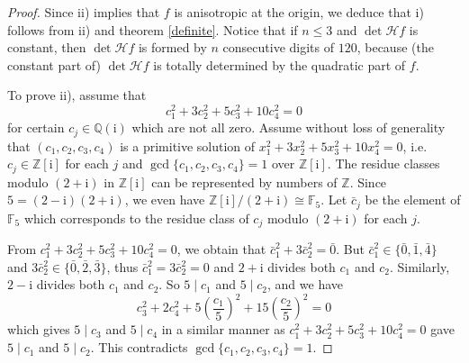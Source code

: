 \documentclass[10pt]{article}
\theoremstyle{remark}
\theoremstyle{definition}
\newcommand{\hess}{{\mathcal H}}
\newcommand{\F}{{\mathbb F}}
\newcommand{\Q}{{\mathbb Q}}
\newcommand{\Z}{{\mathbb Z}}
\newcommand{\I}{{\mathrm i}}
\begin{document}
\begin{proof}
Since ii) implies that $f$ is anisotropic at the origin, we deduce that
i) follows from ii) and theorem \ref{definite}. Notice that if $n \le 3$ and $\det \hess f$ 
is constant, then $\det \hess f$ is formed by $n$ consecutive digits of $120$, because 
(the constant part of) $\det \hess f$ is totally determined by the quadratic part of $f$.

To prove ii), assume that 
$$
c_1^2 + 3 c_2^2 + 5 c_3^2 + 10 c_4^2 = 0
$$
for certain $c_j \in \Q(\I)$ which are not all zero. Assume without loss of generality that 
$(c_1,c_2,c_3,c_4)$ is a primitive solution of  $x_1^2 + 3 x_2^2 + 5 x_3^2 + 10 x_4^2 = 0$,
i.e.\@ $c_j \in \Z[\I]$ for each $j$ and $\gcd\{c_1,c_2,c_3,c_4\} = 1$ over $\Z[\I]$.
The residue classes modulo $(2 + \I)$ in $\Z[\I]$ can be represented by numbers of $\Z$.
Since $5 = (2-\I)(2 + \I)$, we even have $\Z[\I]/(2 + \I) \cong \F_5$. Let
$\bar{c}_j$ be the element of $\F_5$ which corresponds to the residue class of $c_j$ modulo
$(2 + \I)$ for each $j$.

From $c_1^2 + 3 c_2^2 + 5 c_3^2 + 10 c_4^2 = 0$, we obtain that $\bar{c}_1^2 + 3 \bar{c}_2^2 = \bar{0}$.
But $\bar{c}_1^2 \in \{\bar{0},\bar{1},\bar{4}\}$ and $3\bar{c}_2^2 \in \{\bar{0},\bar{2},\bar{3}\}$,
thus $\bar{c}_1^2 = 3 \bar{c}_2^2 = 0$ and $2 + \I$ divides both
$c_1$ and $c_2$. Similarly, $2 - \I$ divides both
$c_1$ and $c_2$. So $5 \mid c_1$ and $5 \mid c_2$, and we have
$$
c_3^2 + 2 c_4^2 + 5 \left( \frac{c_1}{5} \right)^2 + 15 \left( \frac{c_2}{5} \right)^2 = 0
$$
which gives $5 \mid c_3$ and $5 \mid c_4$ in a similar manner as 
$c_1^2 + 3 c_2^2 + 5 c_3^2 + 10 c_4^2 = 0$ gave $5 \mid c_1$ and $5 \mid c_2$.
This contradicts $\gcd\{c_1,c_2,c_3,c_4\} = 1$.
\end{proof}




\end{document}
